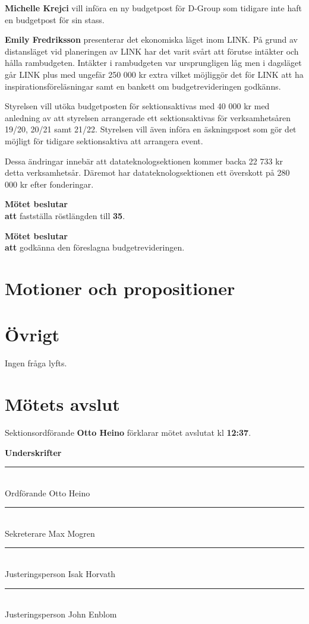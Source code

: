 \documentclass{datateknologsektionen-document}
\newcommand{\ind}{\hspace*{2em}}
\newcommand{\motetbeslutar}{\textbf{Mötet beslutar}}
\newcommand{\att}{\\\ind\textbf{att}}
\begin{document}
\textbf{Michelle Krejci} vill införa en ny budgetpost för D-Group som tidigare inte haft en budgetpost för sin stass.

\textbf{Emily Fredriksson} presenterar det ekonomiska läget inom LINK.
På grund av distansläget vid planeringen av LINK har det varit svårt att förutse intäkter och hålla rambudgeten. Intäkter i rambudgeten var ursprungligen låg men i dagsläget går LINK plus med ungefär 250 000 kr extra vilket möjliggör det för LINK att ha inspirationsföreläsningar samt en bankett om budgetrevideringen godkänns.

Styrelsen vill utöka budgetposten för sektionsaktivas med 40 000 kr med anledning av att styrelsen arrangerade ett sektionsaktivas för verksamhetsåren 19/20, 20/21 samt 21/22. Styrelsen vill även införa en äskningspost som gör det möjligt för tidigare sektionsaktiva att arrangera event. 

Dessa ändringar innebär att datateknologsektionen kommer backa 22 733 kr detta verksamhetsår. Däremot har datateknologsektionen ett överskott på 280 000 kr efter fonderingar.

\smallskip

\motetbeslutar\att{} fastställa röstlängden till \textbf{35}.

\motetbeslutar\att{} godkänna den föreslagna budgetrevideringen.

\section{Motioner och propositioner}




\section{Övrigt}
Ingen fråga lyfts.



\section{Mötets avslut}
Sektionsordförande \textbf{Otto Heino} förklarar mötet avslutat kl \textbf{12:37}.




\pagebreak
{\Large\bfseries Underskrifter}

\vspace*{1.2cm}
\noindent\rule{8cm}{1pt}\\
Ordförande Otto Heino

\vspace*{1.2cm}
\noindent\rule{8cm}{1pt}\\
Sekreterare Max Mogren

\vspace*{1.2cm}
\noindent\rule{8cm}{1pt}\\
Justeringsperson Isak Horvath

\vspace*{1.2cm}
\noindent\rule{8cm}{1pt}\\
Justeringsperson John Enblom
\end{document}

